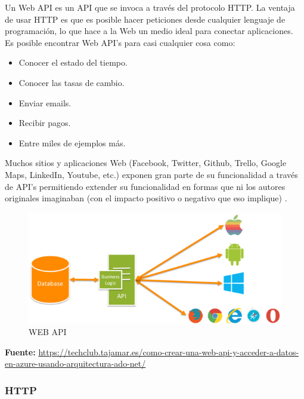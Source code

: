 		{Un Web API es un API que se invoca a través del protocolo HTTP. La ventaja de usar HTTP es que es posible hacer peticiones desde cualquier lenguaje de programación, lo que hace a la Web un medio ideal para conectar aplicaciones.\\
			
		Es posible encontrar Web API’s para casi cualquier cosa como: 
		
		\begin{itemize}
			\item Conocer el estado del tiempo.
			\item Conocer las tasas de cambio.
			\item Enviar emails.
			\item Recibir pagos.
			\item Entre miles de ejemplos más.
		\end{itemize}
			
		Muchos sitios y aplicaciones Web (Facebook, Twitter, Github, Trello, Google Maps, LinkedIn, Youtube, etc.) exponen gran parte de su funcionalidad a través de API’s permitiendo extender su funcionalidad en formas que ni los autores originales imaginaban (con el impacto positivo o negativo que eso implique) \cite{webapi}.
		
		\begin{figure}[H]
			\centering
			\includegraphics[width=0.8\linewidth]{description/framework/webapi.png}
			\caption{WEB API}
		\end{figure}
		\begin{center}
			\textbf{Fuente:} \url{https://techclub.tajamar.es/como-crear-una-web-api-y-acceder-a-datos-en-azure-usando-arquitectura-ado-net/}
		\end{center}
		}
		
		
		\subsubsection{HTTP}
		
